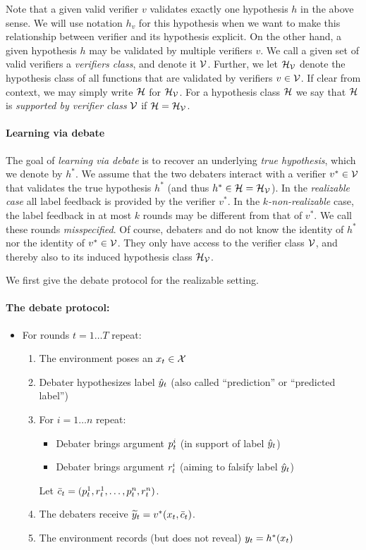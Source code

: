 \documentclass[11pt,letterpaper]{article}
\theoremstyle{definition}
\theoremstyle{plain}
\begin{document}
Note that a given valid verifier $v$ validates exactly one hypothesis $h$ in the above sense. We will use notation $h_v$ for this hypothesis when we want to make this relationship between verifier and its hypothesis explicit. On the other hand, a given hypothesis $h$ may be validated by multiple verifiers $v$.
We call a given set of valid verifiers a \emph{verifiers class}, and denote it ${\mathcal V}$. Further, we let ${{\mathcal H}}_{\mathcal V}$ denote the hypothesis class of all functions that are validated by verifiers $v\in{\mathcal V}$. If clear from context, we may simply write ${{\mathcal H}}$ for ${{\mathcal H}}_{\mathcal V}$.
For a hypothesis class ${{\mathcal H}}$ we say that ${{\mathcal H}}$ is \emph{supported by verifier class} ${\mathcal V}$ if ${{\mathcal H}} = {{\mathcal H}}_{\mathcal V}$.


\paragraph{Learning via debate} The goal of \emph{learning via debate} is to recover an underlying \emph{true hypothesis}, which we denote by $h^*$. We assume that the two debaters interact with a verifier $v^*\in{\mathcal V}$ that validates the true hypothesis $h^*$ (and thus $h^*\in{{\mathcal H}} = {{\mathcal H}}_{\mathcal V}$).
In the \emph{realizable case} all label feedback is provided by the verifier $v^*$.
In the \emph{$k$-non-realizable} case, the label feedback in at most $k$ rounds may be different from that of $v^*$. We call these rounds \emph{misspecified}. Of course, debaters \dt and \df do not know the identity of $h^*$ nor the identity of $v^*\in{\mathcal V}$. They only have access to the verifier class ${\mathcal V}$, and thereby also to its induced hypothesis class ${{\mathcal H}}_{\mathcal V}$.

We first give the debate protocol for the realizable setting. 
\paragraph{The debate protocol:}
\begin{itemize}
\item For rounds $t = 1\ldots T$ repeat:
\begin{enumerate}
 \item The environment poses an $x_t\in{\mathcal X}$
 \item Debater \dt hypothesizes label ${\hat{y}}_t$ (also called ``prediction'' or ``predicted label'')
 \item For $i = 1 \ldots n$ repeat:
 \begin{itemize}
  \item Debater \dt brings argument ${p}^i_t$ (in support of label ${\hat{y}}_t$)
  \item Debater \df brings argument ${r}^i_t$ (aiming to falsify label ${\hat{y}}_t$)
 \end{itemize}
Let $\bar{c}_t=({p}^1_t,{r}^1_t,\ldots,{p}^n_t,{r}^n_t)$.
 \item The debaters receive ${\widetilde{y}}_t=v^*(x_t,\bar{c}_t)$. 
 \item %
       The environment records (but does not reveal) $y_t = h^*(x_t)$ 
\end{enumerate}
\end{itemize}
\end{document}
